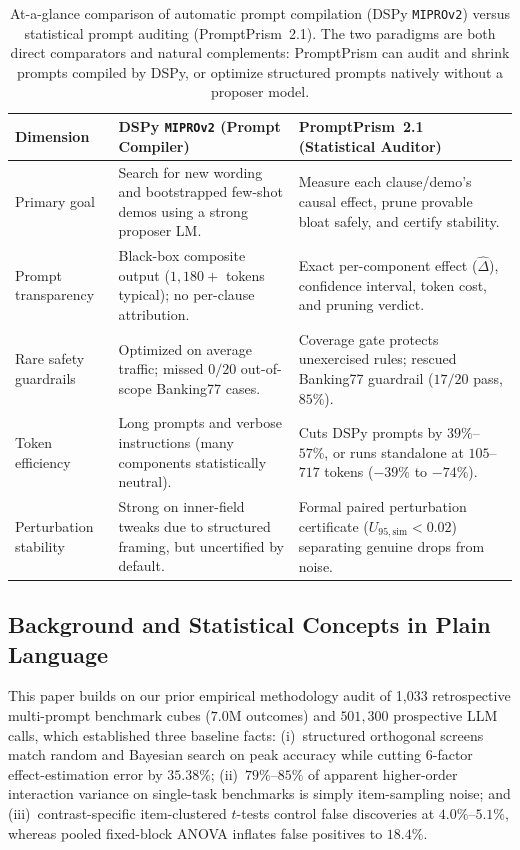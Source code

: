 \documentclass[11pt,a4paper]{article}
\newcommand{\method}{PromptPrism}
\begin{document}
\begin{table}[!ht]
\centering
\footnotesize
\setlength{\tabcolsep}{4.5pt}
\caption{At-a-glance comparison of automatic prompt compilation (DSPy \texttt{MIPROv2}) versus statistical prompt auditing (\method{}~2.1). The two paradigms are both direct comparators and natural complements: \method{} can audit and shrink prompts compiled by DSPy, or optimize structured prompts natively without a proposer model.}
\label{tab:p2_comparison}
\begin{tabularx}{\textwidth}{@{}l>{\raggedright\arraybackslash}X>{\raggedright\arraybackslash}X@{}}
\toprule
\textbf{Dimension} & \textbf{DSPy \texttt{MIPROv2} (Prompt Compiler)} & \textbf{\method{}~2.1 (Statistical Auditor)} \\
\midrule
Primary goal & Search for new wording and bootstrapped few-shot demos using a strong proposer LM. & Measure each clause/demo's causal effect, prune provable bloat safely, and certify stability. \\
Prompt transparency & Black-box composite output ($1{,}180+$ tokens typical); no per-clause attribution. & Exact per-component effect ($\hat{\Delta}$), confidence interval, token cost, and pruning verdict. \\
Rare safety guardrails & Optimized on average traffic; missed $0/20$ out-of-scope Banking77 cases. & Coverage gate protects unexercised rules; rescued Banking77 guardrail ($17/20$ pass, $85\%$). \\
Token efficiency & Long prompts and verbose instructions (many components statistically neutral). & Cuts DSPy prompts by $39\%$--$57\%$, or runs standalone at $105$--$717$ tokens ($-39\%$ to $-74\%$). \\
Perturbation stability & Strong on inner-field tweaks due to structured framing, but uncertified by default. & Formal paired perturbation certificate ($U_{95,\mathrm{sim}} < 0.02$) separating genuine drops from noise. \\
\bottomrule
\end{tabularx}
\end{table}

\subsection{Background and Statistical Concepts in Plain Language}
This paper builds on our prior empirical methodology audit of 1,033 retrospective multi-prompt benchmark cubes ($7.0\text{M}$ outcomes) and $501{,}300$ prospective LLM calls, which established three baseline facts: (i)~structured orthogonal screens match random and Bayesian search on peak accuracy while cutting 6-factor effect-estimation error by $35.38\%$; (ii)~$79\%$--$85\%$ of apparent higher-order interaction variance on single-task benchmarks is simply item-sampling noise; and (iii)~contrast-specific item-clustered $t$-tests control false discoveries at $4.0\%$--$5.1\%$, whereas pooled fixed-block ANOVA inflates false positives to $18.4\%$.
\end{document}
